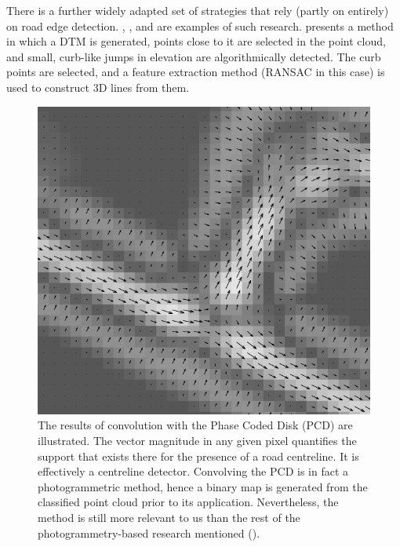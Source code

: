 There is a further widely adapted set of strategies that rely (partly on entirely) on road edge detection. \cite{vosselman_zhou_2009}, \cite{zhang_2010}, and \cite{yang_etal_2013} are examples of such research. \cite{vosselman_zhou_2009} presents a method in which a DTM is generated, points close to it are selected in the point cloud, and small, curb-like jumps in elevation are algorithmically detected. The curb points are selected, and a feature extraction method (RANSAC in this case) is used to construct 3D lines from them.
\begin{figure}
    \includegraphics[width=\linewidth]{p2/figs/clode_etal_2007_01.png} 
    \caption{The results of convolution with the Phase Coded Disk (PCD) are illustrated. The vector magnitude in any given pixel quantifies the support that exists there for the presence of a road centreline. It is effectively a centreline detector. Convolving the PCD is in fact a photogrammetric method, hence a binary map is generated from the classified point cloud prior to its application. Nevertheless, the method is still more relevant to us than the rest of the photogrammetry-based research mentioned (\cite{clode_etal_2007}).}
    \label{fig:phasecodeddisk}
\end{figure}

